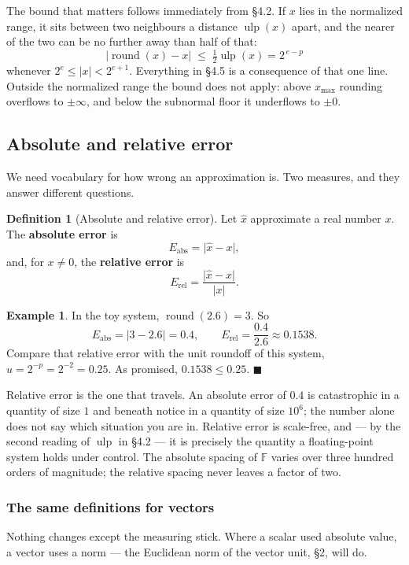 \documentclass[11pt]{article}
\theoremstyle{plain}
\theoremstyle{definition}
\newtheorem{defn}{Definition}[section]
\newtheorem{ex}{Example}[section]
\theoremstyle{remark}
\newcommand{\F}{\mathbb{F}}
\begin{document}
\noindent The bound that matters follows immediately from \S4.2. If $x$ lies in
the normalized range, it sits between two neighbours a distance
$\operatorname{ulp}(x)$ apart, and the nearer of the two can be no further away
than half of that:
\[
  \boxed{\;\bigl|\operatorname{round}(x)-x\bigr|
        \;\le\; \tfrac12\operatorname{ulp}(x) = 2^{\,e-p}\;}
\]
whenever $2^{e}\le|x|<2^{e+1}$. Everything in \S4.5 is a consequence of that one
line. Outside the normalized range the bound does not apply: above $x_{\max}$
rounding overflows to $\pm\infty$, and below the subnormal floor it underflows
to $\pm0$.

\subsection{Absolute and relative error}
We need vocabulary for how wrong an approximation is. Two measures, and they
answer different questions.

\begin{defn}[Absolute and relative error]
Let $\hat{x}$ approximate a real number $x$. The \textbf{absolute error} is
\[
  E_{\text{abs}} = \lvert \hat{x}-x\rvert ,
\]
and, for $x\neq0$, the \textbf{relative error} is
\[
  E_{\text{rel}} = \frac{\lvert \hat{x}-x\rvert}{\lvert x\rvert} .
\]
\end{defn}

\begin{ex}
In the toy system, $\operatorname{round}(2.6)=3$. So
\[
  E_{\text{abs}} = |3-2.6| = 0.4,
  \qquad
  E_{\text{rel}} = \frac{0.4}{2.6} \approx 0.1538 .
\]
Compare that relative error with the unit roundoff of this system,
$u = 2^{-p}=2^{-2}=0.25$. As promised, $0.1538 \le 0.25$. \hfill$\blacksquare$
\end{ex}

\noindent Relative error is the one that travels. An absolute error of $0.4$ is
catastrophic in a quantity of size $1$ and beneath notice in a quantity of size
$10^{6}$; the number alone does not say which situation you are in. Relative
error is scale-free, and --- by the second reading of $\operatorname{ulp}$ in
\S4.2 --- it is precisely the quantity a floating-point system holds under
control. The absolute spacing of $\F$ varies over three hundred orders of
magnitude; the relative spacing never leaves a factor of two.

\subsubsection*{The same definitions for vectors}
Nothing changes except the measuring stick. Where a scalar used absolute value,
a vector uses a norm --- the Euclidean norm of the vector unit, \S2, will do.
\end{document}
